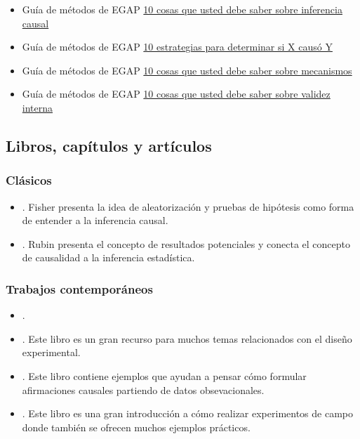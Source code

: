 \documentclass[12pt,spanish,]{book}
\begin{document}
\begin{itemize}
\item
  Guía de métodos de EGAP \href{https://egap.org/es/resource/10-cosas-que-debe-saber-sobre-la-inferencia-causal/}{10 cosas que usted debe saber sobre inferencia causal}
\item
  Guía de métodos de EGAP \href{https://egap.org/es/resource/10-estrategias-para-entender-si-x-causa-y/}{10 estrategias para determinar si X causó Y}
\item
  Guía de métodos de EGAP \href{https://egap.org/es/resource/10-cosas-debe-saber-sobre-los-mecanismos/}{10 cosas que usted debe saber sobre mecanismos}
\item
  Guía de métodos de EGAP \href{https://egap.org/es/resource/10-cosas-que-debe-saber-sobre-la-validez-externa/}{10 cosas que usted debe saber sobre validez interna}
\end{itemize}

\hypertarget{causalinference-cites}{%
\subsection{Libros, capítulos y artículos}\label{causalinference-cites}}

\hypertarget{causalinference-classics}{%
\subsubsection{Clásicos}\label{causalinference-classics}}

\begin{itemize}
\item
  \autocite{fisher_design_1935}. Fisher presenta la idea de aleatorización y pruebas de hipótesis como forma de entender a la inferencia causal.
\item
  \autocite{rubin:1974}. Rubin presenta el concepto de resultados potenciales y conecta el concepto de causalidad a la inferencia estadística.
\end{itemize}

\hypertarget{trabajos-contemporuxe1neos}{%
\subsubsection{Trabajos contemporáneos}\label{trabajos-contemporuxe1neos}}

\begin{itemize}
\item
  \autocite{brady2008causation}.
\item
  \autocite[Capítulo 1]{gerber_field_2012}. Este libro es un gran recurso para muchos temas relacionados con el diseño experimental.
\item
  \autocite[Capítulo 1]{morgan_counterfactuals_2007}. Este libro contiene ejemplos que ayudan a pensar cómo formular afirmaciones causales partiendo de datos obsevacionales.
\item
  \autocite{glennerster_running_2013}. Este libro es una gran introducción a cómo realizar experimentos de campo donde también se ofrecen muchos ejemplos prácticos.
\end{itemize}
\end{document}
